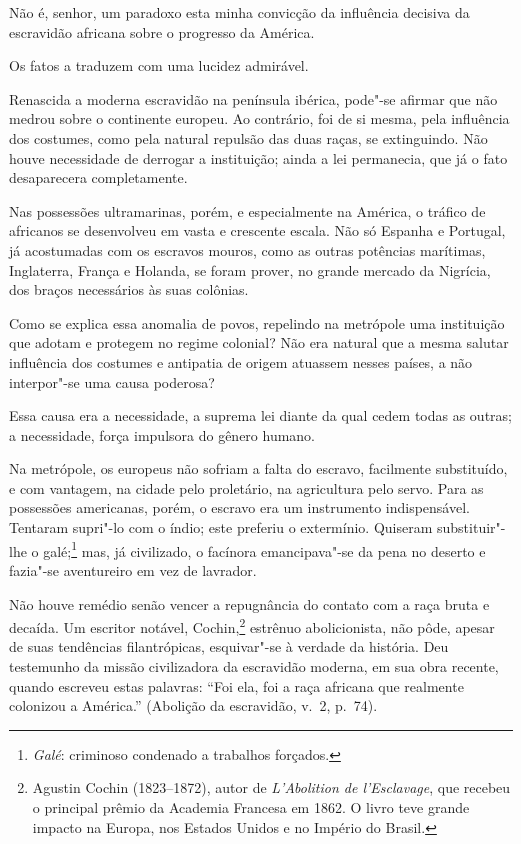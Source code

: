 \sectionitem

\begin{linenumbers}

Não é, senhor, um paradoxo esta minha convicção da influência decisiva
da escravidão africana sobre o progresso da América.

Os fatos a traduzem com uma lucidez admirável.

Renascida a moderna escravidão na península ibérica, pode"-se afirmar
que não medrou sobre o continente europeu. Ao contrário, foi de si
mesma, pela influência dos costumes, como pela natural repulsão das
duas raças, se extinguindo. Não houve necessidade de derrogar a
instituição; ainda a lei permanecia, que já o fato desaparecera completamente. 

Nas possessões ultramarinas, porém, e especialmente na América, o
tráfico de africanos se desenvolveu em vasta e crescente escala. Não só
Espanha e Portugal, já acostumadas com os escravos mouros, como as
outras potências marítimas, Inglaterra, França e Holanda, se foram
prover, no grande mercado da Nigrícia, dos braços necessários às suas colônias. 

Como se explica essa anomalia de povos, repelindo na metrópole uma
instituição que adotam e protegem no regime colonial? Não era natural
que a mesma salutar influência dos costumes e antipatia de origem
atuassem nesses países, a não interpor"-se uma causa poderosa? 

Essa causa era a necessidade, a suprema lei diante da qual cedem todas
as outras; a necessidade, força impulsora do gênero humano.

Na metrópole, os europeus não sofriam a falta do escravo, facilmente
substituído, e com vantagem, na cidade pelo proletário, na agricultura
pelo servo. Para as possessões americanas, porém, o escravo era um
instrumento indispensável. Tentaram supri"-lo com o índio; este
preferiu o extermínio. Quiseram substituir"-lhe o
galé;\footnote{ \textit{Galé}: criminoso condenado a trabalhos forçados.} 
mas, já civilizado, o facínora emancipava"-se da pena no deserto e
fazia"-se aventureiro em vez de lavrador.

Não houve remédio senão vencer a repugnância do contato com a raça bruta
e decaída. Um escritor notável,
Cochin,\footnote{ Agustin Cochin (1823--1872), autor de \textit{L'Abolition de l'Esclavage}, 
que recebeu o principal prêmio da Academia Francesa em 1862. O livro teve grande 
impacto na Europa, nos Estados Unidos e no Império do Brasil.} 
estrênuo abolicionista, não pôde, apesar de suas tendências
filantrópicas, esquivar"-se à verdade da história. Deu testemunho da
missão civilizadora da escravidão moderna, em sua obra recente, quando
escreveu estas palavras: ``Foi ela, foi a raça africana que
realmente colonizou a América.'' (Abolição da escravidão, v.~2, p.~74).


\end{linenumbers}
